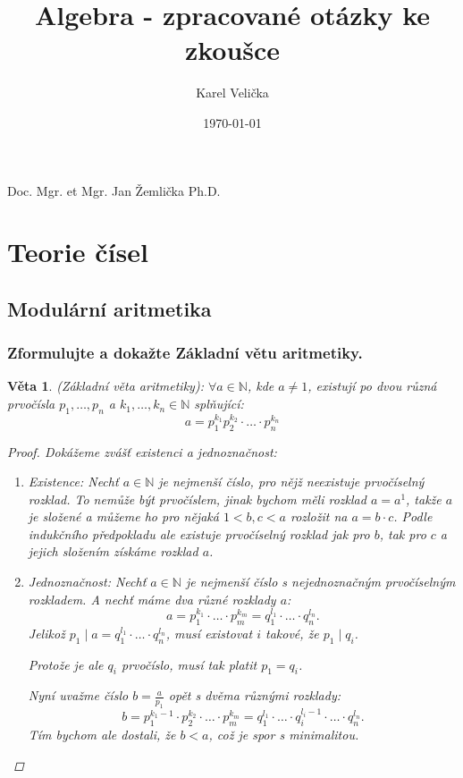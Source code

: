 \documentclass[10pt,a4paper]{article}
\title{Algebra - zpracované otázky ke zkoušce}
\date{\today}
\author{\sc Karel Velička}
\newtheorem{veta}{Věta}
\newcommand{\N}{{\mathbb{N}}}       %
\begin{document}
\maketitle
\begin{center}
    Doc. Mgr. et Mgr. Jan Žemlička Ph.D.
\end{center}

\tableofcontents
\newpage




\section{Teorie čísel}

\subsection{Modulární aritmetika}

\subsubsection{Zformulujte a dokažte Základní větu aritmetiky.}

\begin{veta} (Základní věta aritmetiky): \normalfont
    $\forall a \in \N$, kde $a \neq 1$, existují po dvou různá prvočísla $p_1, \ldots , p_n$ a $k_1, \ldots, k_n \in \N$ splňující:
    $$a = p_1^{k_1}p_2^{k_2}\cdot \ldots \cdot p_n^{k_n}$$
\begin{proof} Dokážeme zvášť existenci a jednoznačnost:
    \begin{enumerate}[label=(\roman*)]
        \item Existence: Nechť $a\in \N$ je nejmenší číslo, pro nějž neexistuje prvočíselný rozklad.
        To nemůže být prvočíslem, jinak bychom měli rozklad $a = a^1$, takže $a$ je složené a můžeme ho pro nějaká $1<b, c < a$ rozložit na $a= b\cdot c$. 
        Podle indukčního předpokladu ale existuje prvočíselný rozklad jak pro $b$, tak pro $c$ a jejich složením získáme rozklad $a$.
        \item Jednoznačnost: Nechť $a\in \N$ je nejmenší číslo s nejednoznačným prvočíselným rozkladem. A nechť máme dva různé rozklady $a$:
        $$a = p_1^{k_1}\cdot \ldots \cdot p_m^{k_m} = q_1^{l_1}\cdot \ldots \cdot q_n^{l_n}.$$
        Jelikož $p_1 \mid a  = q_1^{l_1}\cdot \ldots \cdot q_n^{l_n}$, musí existovat $i$ takové, že $p_1 \mid q_i$.

        Protože je ale $q_i$ prvočíslo, musí tak platit $p_1 = q_i$.

        Nyní uvažme číslo $b = \frac a{p_1}$ opět s dvěma různými rozklady: 
        $$b = p_1^{k_1-1}\cdot p_2^{k_2}\cdot \ldots \cdot p_m^{k_m} = q_1^{l_1}\cdot \ldots \cdot q_i^{l_i-1} \cdot \ldots \cdot q_n^{l_n}.$$
        Tím bychom ale dostali, že $b< a$, což je spor s minimalitou.
    \end{enumerate}
\end{proof}
\end{veta}
\end{document}

